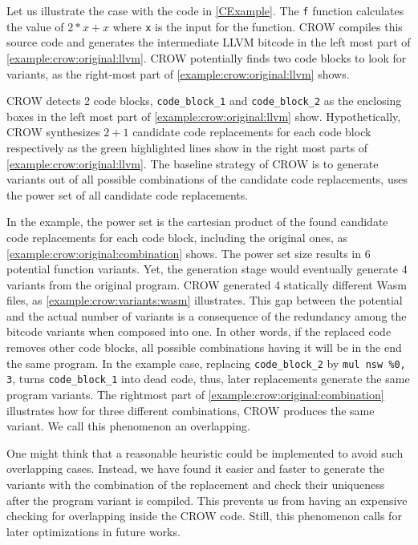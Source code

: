 Let us illustrate the case with the code in \autoref{CExample}. The \texttt{f} function calculates the value of $2 * x + x$ where \texttt{x} is the input for the function. CROW compiles this source code and generates the intermediate LLVM bitcode in the left most part of \autoref{example:crow:original:llvm}. CROW potentially finds two code blocks to look for variants, as the right-most part of \autoref{example:crow:original:llvm} shows.



CROW detects 2 code blocks, \texttt{code\_block\_1} and \texttt{code\_block\_2} as the enclosing boxes in the left most part of \autoref{example:crow:original:llvm} show. Hypothetically, CROW synthesizes $2 + 1$ candidate code replacements for each code block respectively as the green highlighted lines show in the right most parts of \autoref{example:crow:original:llvm}.
The baseline strategy of CROW is to generate variants out of all possible combinations of the candidate code replacements, \ie uses the power set of all candidate code replacements.

In the example, the power set is the cartesian product of the found candidate code replacements for each code block, including the original ones, as \autoref{example:crow:original:combination} shows. The power set size results in $6$ potential function variants. Yet, the generation stage would eventually generate $4$ variants from the original program. CROW generated 4 statically different Wasm files, as \autoref{example:crow:variants:wasm} illustrates. This gap between the potential and the actual number of variants is a consequence of the redundancy among the bitcode variants when composed into one. In other words, if the replaced code removes other code blocks, all possible combinations having it will be in the end the same program. In the example case, replacing \texttt{code\_block\_2} by \texttt{mul nsw \%0, 3}, turns \texttt{code\_block\_1} into dead code, thus, later replacements generate the same program variants. The rightmost part of \autoref{example:crow:original:combination} illustrates how for three different combinations, CROW produces the same variant. We call this phenomenon an overlapping.



One might think that a reasonable heuristic could be implemented to avoid such overlapping cases. Instead, we have found it easier and faster to generate the variants with the combination of the replacement and check their uniqueness after the program variant is compiled. This prevents us from having an expensive checking for overlapping inside the CROW code. Still, this phenomenon calls for later optimizations in future works.
